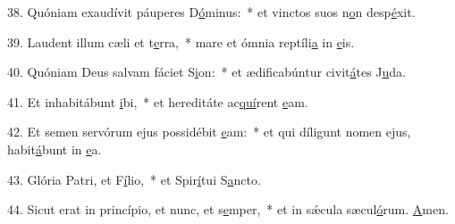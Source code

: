 38. Quóniam exaudívit páuperes D\uline{ó}minus:~* et vinctos suos n\uline{o}n desp\uline{é}xit.\par 
39. Laudent illum cæli et t\uline{e}rra,~* mare et ómnia reptíli\uline{a} in \uline{e}is.\par 
40. Quóniam Deus salvam fáciet S\uline{i}on:~* et ædificabúntur civit\uline{á}tes J\uline{u}da.\par 
41. Et inhabitábunt \uline{i}bi,~* et hereditáte ac\uline{quí}rent \uline{e}am.\par 
42. Et semen servórum ejus possidébit \uline{e}am:~* et qui díligunt nomen ejus, habit\uline{á}bunt in \uline{e}a.\par 
43. Glória Patri, et F\uline{í}lio,~* et Spir\uline{í}tui S\uline{a}ncto.\par 
44. Sicut erat in princípio, et nunc, et s\uline{e}mper,~* et in sǽcula sæcul\uline{ó}rum. \uline{A}men.\par 
